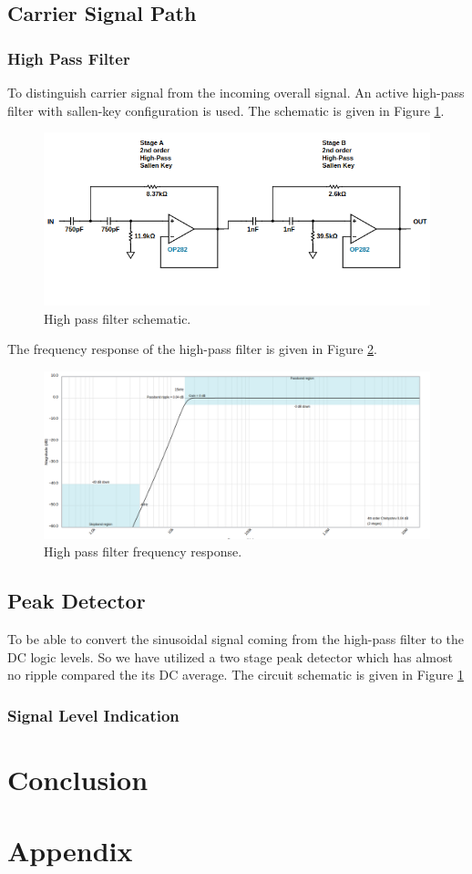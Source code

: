 \documentclass[a4paper,10pt]{IEEEtran}
\begin{document}
\subsection{Carrier Signal Path}
\subsubsection{High Pass Filter}
To distinguish carrier signal from the  incoming overall signal. An active high-pass filter with sallen-key configuration  is used. The schematic is given in Figure \ref{highpass}.
\begin{figure}[htbp!]
    \centering
    \includegraphics[width = 1\linewidth]{active_high_pass_circuit.png}
    \caption{High pass filter schematic. }
    \label{highpass}
\end{figure} 
The frequency response of the high-pass filter is given in Figure \ref{highpass_resp}.
\begin{figure}[htbp!]
    \centering
    \includegraphics[width = 1\linewidth]{active_high_pass.png}
    \caption{High pass filter frequency response.}
    \label{highpass_resp}
\end{figure} 
\subsection{Peak Detector}
To be able to convert the sinusoidal signal coming from the high-pass filter to the DC logic levels. So we have utilized a two stage peak detector which has almost no ripple compared the its DC average. The circuit schematic is given in Figure \ref{}
\subsubsection{Signal Level Indication}


\section{Conclusion}

\section*{Appendix}
\end{document}
